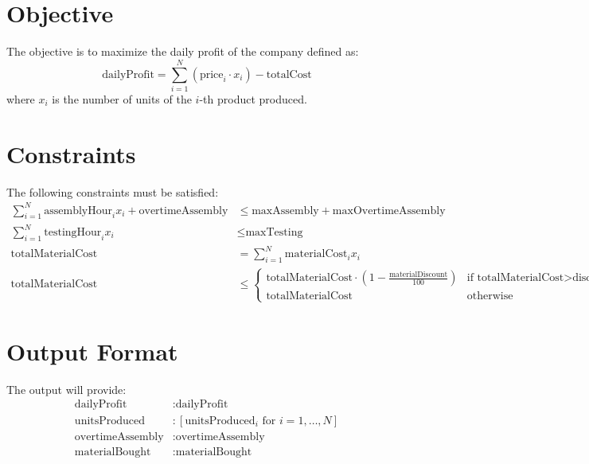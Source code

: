 \documentclass{article}
\begin{document}
\section*{Objective}
The objective is to maximize the daily profit of the company defined as:
\[
\text{dailyProfit} = \sum_{i=1}^{N} (\text{price}_i \cdot x_i) - \text{totalCost}
\]
where \( x_i \) is the number of units of the \( i \)-th product produced.

\section*{Constraints}
The following constraints must be satisfied:
\begin{align}
    \sum_{i=1}^{N} \text{assemblyHour}_i x_i + \text{overtimeAssembly} & \leq \text{maxAssembly} + \text{maxOvertimeAssembly} \\
    \sum_{i=1}^{N} \text{testingHour}_i x_i & \leq \text{maxTesting} \\
    \text{totalMaterialCost} & = \sum_{i=1}^{N} \text{materialCost}_i x_i \\
    \text{totalMaterialCost} & \leq \begin{cases} 
    \text{totalMaterialCost} \cdot (1 - \frac{\text{materialDiscount}}{100}) & \text{if totalMaterialCost} > \text{discountThreshold} \\
    \text{totalMaterialCost} & \text{otherwise}
    \end{cases}
\end{align}

\section*{Output Format}
The output will provide:
\begin{align*}
    \text{dailyProfit} & : \text{dailyProfit} \\
    \text{unitsProduced} & : [\text{unitsProduced}_i \text{ for } i = 1, \ldots, N] \\
    \text{overtimeAssembly} & : \text{overtimeAssembly} \\
    \text{materialBought} & : \text{materialBought}
\end{align*}
\end{document}
